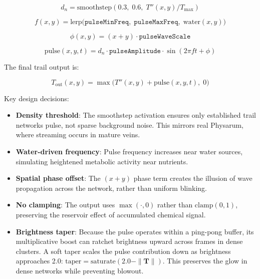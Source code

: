 \documentclass[12pt, titlepage]{article}
\begin{document}
\begin{equation}
    d_n = \text{smoothstep}(0.3,\; 0.6,\; T''(x,y) / T_{\max})
\end{equation}

\begin{equation}
    f(x,y) = \text{lerp}\big(\texttt{pulseMinFreq},\;
    \texttt{pulseMaxFreq},\; \text{water}(x,y)\big)
\end{equation}

\begin{equation}
    \phi(x,y) = (x + y) \cdot \texttt{pulseWaveScale}
\end{equation}

\begin{equation}
    \text{pulse}(x,y,t) = d_n \cdot \texttt{pulseAmplitude} \cdot
    \sin(2\pi f t + \phi)
\end{equation}

The final trail output is:

\begin{equation}
    T_{\text{out}}(x,y) = \max\big(T''(x,y) + \text{pulse}(x,y,t),\; 0\big)
\end{equation}

Key design decisions:
\begin{itemize}
    \item \textbf{Density threshold}: The smoothstep activation ensures only
    established trail networks pulse, not sparse background noise. This mirrors
    real Physarum, where streaming occurs in mature veins.

    \item \textbf{Water-driven frequency}: Pulse frequency increases near water
    sources, simulating heightened metabolic activity near nutrients.

    \item \textbf{Spatial phase offset}: The $(x+y)$ phase term creates the
    illusion of wave propagation across the network, rather than uniform
    blinking.

    \item \textbf{No clamping}: The output uses $\max(\cdot, 0)$ rather than
    $\text{clamp}(0, 1)$, preserving the reservoir effect of accumulated
    chemical signal.

    \item \textbf{Brightness taper}: Because the pulse operates within a
    ping-pong buffer, its multiplicative boost can ratchet brightness upward
    across frames in dense clusters. A soft taper scales the pulse contribution
    down as brightness approaches 2.0:
    $\text{taper} = \text{saturate}(2.0 - \|\mathbf{T}\|)$. This preserves the
    glow in dense networks while preventing blowout.
\end{itemize}
\end{document}
